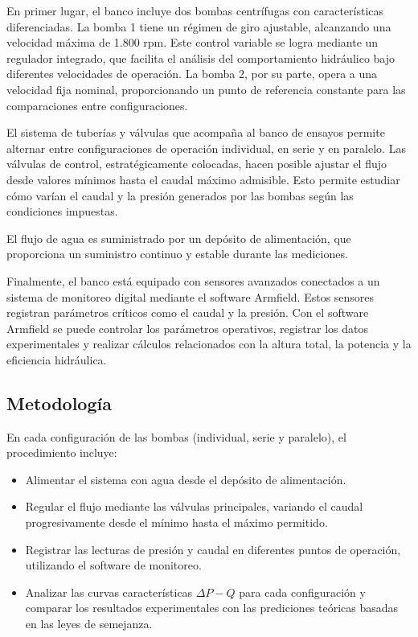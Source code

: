 \documentclass[10pt]{IEEEtran}
\begin{document}
En primer lugar, el banco incluye dos bombas centrífugas con características diferenciadas. La bomba 1 tiene un régimen de giro ajustable, alcanzando una velocidad máxima de 1.800 rpm. Este control variable se logra mediante un regulador integrado, que facilita el análisis del comportamiento hidráulico bajo diferentes velocidades de operación. La bomba 2, por su parte, opera a una velocidad fija nominal, proporcionando un punto de referencia constante para las comparaciones entre configuraciones.

El sistema de tuberías y válvulas que acompaña al banco de ensayos permite alternar entre configuraciones de operación individual, en serie y en paralelo. Las válvulas de control, estratégicamente colocadas, hacen posible ajustar el flujo desde valores mínimos hasta el caudal máximo admisible. Esto permite estudiar cómo varían el caudal y la presión generados por las bombas según las condiciones impuestas.

El flujo de agua es suministrado por un depósito de alimentación, que proporciona un suministro continuo y estable durante las mediciones.

Finalmente, el banco está equipado con sensores avanzados conectados a un sistema de monitoreo digital mediante el software Armfield. Estos sensores registran parámetros críticos como el caudal y la presión. Con el software Armfield se puede controlar los parámetros operativos, registrar los datos experimentales y realizar cálculos relacionados con la altura total, la potencia y la eficiencia hidráulica.

\subsection{Metodología}
En cada configuración de las bombas (individual, serie y paralelo), el procedimiento incluye:
\begin{itemize}
  \item Alimentar el sistema con agua desde el depósito de alimentación.
  \item Regular el flujo mediante las válvulas principales, variando el caudal progresivamente desde el mínimo hasta el máximo permitido.
  \item Registrar las lecturas de presión y caudal en diferentes puntos de operación, utilizando el software de monitoreo.
  \item Analizar las curvas características $\Delta P - Q$ para cada configuración y comparar los resultados experimentales con las prediciones teóricas basadas en las leyes de semejanza.
\end{itemize}
\end{document}
